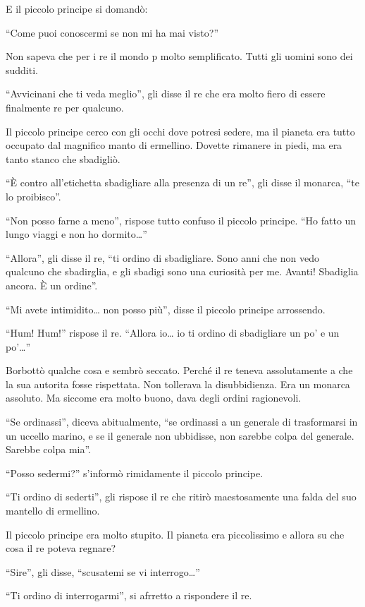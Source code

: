 \documentclass[11pt]{scrbook}
\begin{document}
E il piccolo principe si domandò:

``Come puoi conoscermi se non mi ha mai visto?''

Non sapeva che per i re il mondo p molto semplificato. Tutti gli uomini sono dei sudditi.

``Avvicinani che ti veda meglio'', gli disse il re che era molto fiero di essere finalmente re per qualcuno.

Il piccolo principe cerco con gli occhi dove potresi sedere, ma il pianeta era tutto occupato dal magnifico manto di ermellino. Dovette rimanere in piedi, ma era tanto stanco che sbadigliò.

``È contro all'etichetta sbadigliare alla presenza di un re'', gli disse il monarca, ``te lo proibisco''.

``Non posso farne a meno'', rispose tutto confuso il piccolo principe. ``Ho fatto un lungo viaggi e non ho dormito\ldots{}''

``Allora'', gli disse il re, ``ti ordino di sbadigliare. Sono anni che non vedo qualcuno che sbadirglia, e gli sbadigi sono una curiosità per me. Avanti! Sbadiglia ancora. È un ordine''.

``Mi avete intimidito\ldots{} non posso più'', disse il piccolo principe arrossendo.

``Hum! Hum!'' rispose il re. ``Allora io\ldots{} io ti ordino di sbadigliare un po' e un po'\ldots{}''

Borbottò qualche cosa e sembrò seccato. Perché il re teneva assolutamente a che la sua autorita fosse rispettata. Non tollerava la disubbidienza. Era un monarca assoluto. Ma siccome era molto buono, dava degli ordini ragionevoli.

``Se ordinassi'', diceva abitualmente, ``se ordinassi a un generale di trasformarsi in un uccello marino, e se il generale non ubbidisse, non sarebbe colpa del generale. Sarebbe colpa mia''.

``Posso sedermi?'' s'informò rimidamente il piccolo principe.

``Ti ordino di sederti'', gli rispose il re che ritirò maestosamente una falda del suo mantello di ermellino.

Il piccolo principe era molto stupito. Il pianeta era piccolissimo e allora su che cosa il re poteva regnare?

``Sire'', gli disse, ``scusatemi se vi interrogo\ldots{}''

``Ti ordino di interrogarmi'', si afrretto a rispondere il re.
\end{document}
